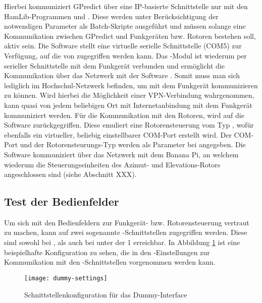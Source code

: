 Hierbei kommuniziert GPredict über eine IP-basierte Schnittstelle nur mit den HamLib-Programmen  und . Diese werden unter Berücksichtigung der notwendigen Parameter als Batch-Skripte ausgeführt und müssen solange eine Kommunikation zwischen GPredict und Funkgeräten bzw. Rotoren bestehen soll, aktiv sein.\newpar
Die Software  stellt eine virtuelle serielle Schnittstelle (COM5) zur Verfügung, auf die von  zugegriffen werden kann. Das -Modul ist wiederum per serieller Schnittstelle mit dem Funkgerät verbunden und ermöglicht die Kommunikation über das Netzwerk mit der Software . Somit muss man sich lediglich im Hochschul-Netzwerk befinden, um mit dem Funkgerät kommunizieren zu können. Wird hierbei die Möglichkeit einer VPN-Verbindung wahrgenommen, kann quasi von jedem beliebigen Ort mit Internetanbindung mit dem Funkgerät kommuniziert werden.\newpar
Für die Kommunikation mit den Rotoren, wird auf die Software  zurückgegriffen. Diese emuliert eine Rotorensteuerung vom Typ , wofür ebenfalls ein virtueller, beliebig einstellbarer COM-Port erstellt wird. Der COM-Port und der Rotorensteurungs-Typ werden als Parameter bei  angegeben. Die Software  kommuniziert über das Netzwerk mit dem Banana Pi, an welchem wiederum die Steuerungseinheiten des Azimut- und Elevations-Rotors angeschlossen sind (siehe Abschnitt XXX).

\subsection{Test der Bedienfelder}

Um sich mit den Bedienfeldern zur Funkgerät- bzw. Rotorensteuerung vertraut zu machen, kann auf zwei sogenannte -Schnittstellen zugegriffen werden. Diese sind sowohl bei , als auch bei  unter der  1 erreichbar. In Abbildung \ref{fig:dummysettings} ist eine beispielhafte Konfiguration zu sehen, die in den -Einstellungen zur Kommunikation mit den -Schnittstellen vorgenommen werden kann.

\begin{figure}[h]
	\centering
	\texttt{[image: dummy-settings]}
	\caption{Schnittstellenkonfiguration für das Dummy-Interface}
	\label{fig:dummysettings} 
\end{figure}

